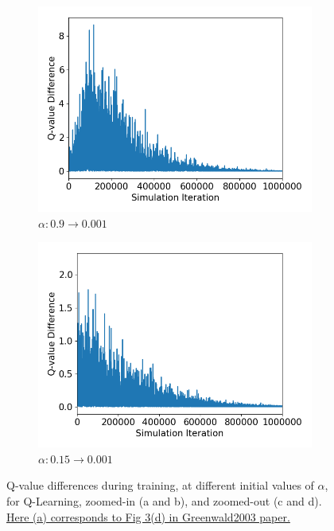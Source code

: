 \documentclass[10pt]{article}
\begin{document}
\begin{figure}[H]
\begin{subfigure}[b]{0.245\linewidth}
  \centering
  \includegraphics[width=\linewidth]{../figs/Q_offpolicy_09_1_1000000_uncut.png}
      \caption{$\alpha:0.9\rightarrow0.001$}
  \label{fig:Q09_y_uncut}
  \end{subfigure}
  \begin{subfigure}[b]{0.245\linewidth}
  \centering
  \includegraphics[width=\linewidth]{../figs/Q_offpolicy_015_0001_1_1_1000000_uncut.png}
      \caption{$\alpha:0.15\rightarrow0.001$}
  \label{fig:Q015_y_uncut}
  \end{subfigure}
  \caption{Q-value differences during training, at different initial values of $\alpha$, for Q-Learning, zoomed-in (a and b), and zoomed-out (c and d). \ul{Here (a) corresponds to Fig 3(d) in Greenwald2003 paper.}\cite{GreenwaldCorrelatedQLearning2003}}
  \label{fig:QL}
\end{figure}
\end{document}
